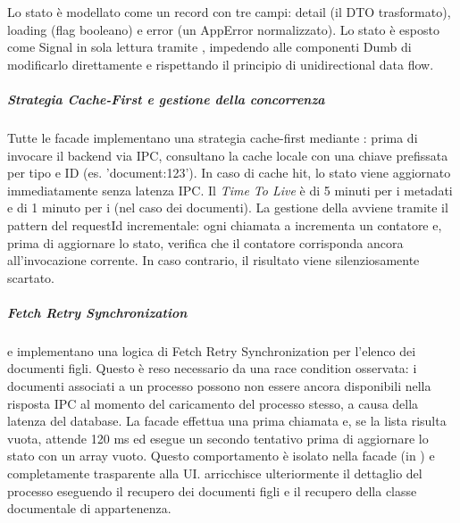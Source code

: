 Lo stato è modellato come un record con tre campi: detail (il DTO trasformato), loading (flag booleano) e error (un AppError normalizzato). Lo stato è esposto come Signal in sola lettura tramite , impedendo alle componenti Dumb di modificarlo direttamente e rispettando il principio di unidirectional data flow.

\subparagraph{Strategia Cache-First e gestione della concorrenza}
Tutte le facade implementano una strategia cache-first mediante : prima di invocare il backend via IPC, consultano la cache locale con una chiave prefissata per tipo e ID (es. 'document:123'). In caso di cache hit, lo stato viene aggiornato immediatamente senza latenza IPC. Il \textit{Time To Live} è di 5 minuti per i metadati e di 1 minuto per i  (nel caso dei documenti).
La gestione della  avviene tramite il pattern del requestId incrementale: ogni chiamata a  incrementa un contatore  e, prima di aggiornare lo stato, verifica che il contatore corrisponda ancora all'invocazione corrente. In caso contrario, il risultato viene silenziosamente scartato.

\subparagraph{Fetch Retry Synchronization}
 e  implementano una logica di Fetch Retry Synchronization per l'elenco dei documenti figli. Questo è reso necessario da una race condition osservata: i documenti associati a un processo possono non essere ancora disponibili nella risposta IPC al momento del caricamento del processo stesso, a causa della latenza del database. La facade effettua una prima chiamata e, se la lista risulta vuota, attende 120 ms ed esegue un secondo tentativo prima di aggiornare lo stato con un array vuoto. Questo comportamento è isolato nella facade (in ) e completamente trasparente alla UI.
 arricchisce ulteriormente il dettaglio del processo eseguendo il recupero dei documenti figli e il recupero della classe documentale di appartenenza.

